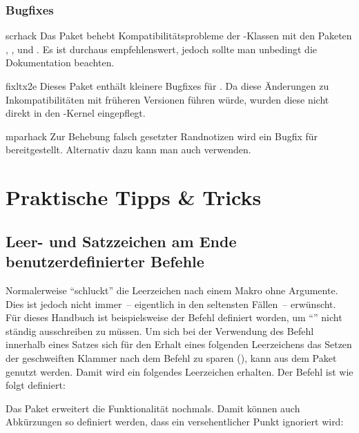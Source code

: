 \documentclass[%
  english,ngerman,%
  headings=optiontoheadandtoc,captions=tableheading,numbers=noenddot,%
  chapterpage,cdfoot,%
]{tudscrman}
\begin{document}
\subsubsection{Bugfixes}
\begin{packages}
\item[scrhack]
  Das Paket behebt Kompatibilitätsprobleme der \KOMAScript-Klassen mit den 
  Paketen , ,  und
  . Es ist durchaus empfehlenswert, jedoch sollte man 
  unbedingt die Dokumentation beachten.
\item[fixltx2e]
  Dieses Paket enthält kleinere Bugfixes für . Da diese 
  Änderungen zu Inkompatibilitäten mit früheren Versionen führen würde, wurden 
  diese nicht direkt in den -Kernel eingepflegt.
\item[mparhack]
  Zur Behebung falsch gesetzter Randnotizen wird ein Bugfix für 
   bereitgestellt. Alternativ dazu kann man auch 
   verwenden.  
\end{packages}


\section{Praktische Tipps \& Tricks}\label{sec:tat}
\subsection{Leer- und Satzzeichen am Ende benutzerdefinierter Befehle}%
\label{sec:tat:xspace}
Normalerweise \enquote{schluckt}  die Leerzeichen nach einem Makro 
ohne Argumente. Dies ist jedoch nicht immer~-- eigentlich in den seltensten 
Fällen~-- erwünscht. Für dieses Handbuch ist beispielsweise der Befehl 
 definiert worden, um \enquote{\TUD{}} nicht ständig ausschreiben zu 
müssen. Um sich bei der Verwendung des Befehl innerhalb eines Satzes sich für 
den Erhalt eines folgenden Leerzeichens das Setzen der geschweiften Klammer nach 
dem Befehl zu sparen (\PParameter{}), kann  aus dem 
Paket  genutzt werden. Damit wird ein folgendes Leerzeichen 
erhalten. Der Befehl  ist wie folgt definiert:
\begin{code}
\newcommand*\TUD{Technische Universit\"at Dresden\xspace}
\end{code}
Das Paket  erweitert die Funktionalität nochmals. Damit 
können auch Abkürzungen so definiert werden, dass ein versehentlicher Punkt 
ignoriert wird:
\begin{code}
\newcommand*\zB{z.\,B\xperiod}
\end{code}
\end{document}
